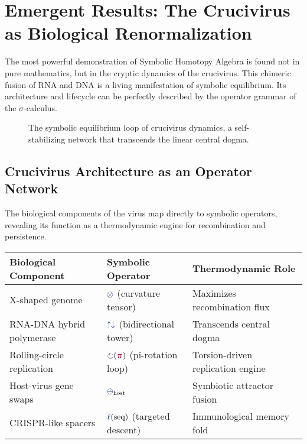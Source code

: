 \section{Emergent Results: The Crucivirus as Biological Renormalization}

The most powerful demonstration of Symbolic Homotopy Algebra is found not in pure mathematics, but in the cryptic dynamics of the crucivirus. This chimeric fusion of RNA and DNA is a living manifestation of symbolic equilibrium. Its architecture and lifecycle can be perfectly described by the operator grammar of the $\sigma$-calculus.

\begin{figure}[h]
    \centering
    \caption{The symbolic equilibrium loop of crucivirus dynamics, a self-stabilizing network that transcends the linear central dogma.}
\end{figure}

\subsection{Crucivirus Architecture as an Operator Network}
The biological components of the virus map directly to symbolic operators, revealing its function as a thermodynamic engine for recombination and persistence.

\begin{center}
\renewcommand{\arraystretch}{1.2}
\begin{tabular}{l l l}
\hline
\textbf{Biological Component} & \textbf{Symbolic Operator} & \textbf{Thermodynamic Role} \\
\hline
X-shaped genome & $\tensor$ (curvature tensor) & Maximizes recombination flux \\
RNA-DNA hybrid polymerase & $\repflow$ (bidirectional tower) & Transcends central dogma \\
Rolling-circle replication & $\rotate(\pirot)$ (pi-rotation loop) & Torsion-driven replication engine \\
Host-virus gene swaps & $\fuse_{\text{host}}$ & Symbiotic attractor fusion \\
CRISPR-like spacers & $\lha(\text{seq})$ (targeted descent) & Immunological memory fold \\
\hline
\end{tabular}
\end{center}

